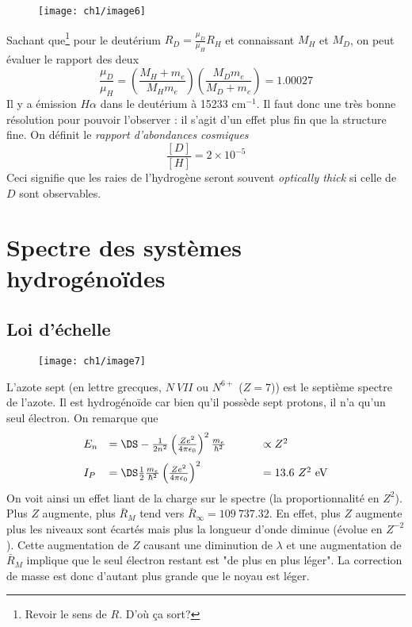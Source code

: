 	\begin{wrapfigure}[14]{l}{6cm}
	\texttt{[image: ch1/image6]}
	\end{wrapfigure}
Sachant que\footnote{Revoir le sens de $R$. D'où ça sort?} pour le deutérium $R_D = \frac{\mu_D}{\mu_H}R_H$ 
et connaissant $M_H$ et $M_D$, on peut évaluer le rapport des deux
\begin{equation}
\frac{\mu_D}{\mu_H} = \left(\frac{M_H+m_e}{M_Hm_e}\right)\left(\frac{M_Dm_e}{M_D+m_e}\right)=1.00027
\end{equation}
Il y a émission $H\alpha$ dans le deutérium à 15233 cm$^{-1}$. Il faut donc une très bonne résolution pour
pouvoir l'observer : il s'agit d'un effet plus fin que la structure fine. On définit le \textit{rapport 
d'abondances cosmiques}
\begin{equation}
\frac{[D]}{[H]}=2\times 10^{-5}
\end{equation}
Ceci signifie que les raies de l'hydrogène seront souvent \textit{optically thick} si celle de $D$ sont 
observables.

\section{Spectre des systèmes hydrogénoïdes}
\subsection{Loi d'échelle}
	\begin{wrapfigure}[8]{r}{6cm}
	\vspace{-8mm}
	\texttt{[image: ch1/image7]}
	\end{wrapfigure}
L'azote sept (en lettre grecques, $N\ VII$ ou $N^{6+}$ ($Z=7$)) est le septième spectre de l'azote. Il
est hydrogénoïde car bien qu'il possède sept protons, il n'a qu'un seul électron. On remarque que 
\begin{equation}
\begin{array}{lll}
E_n &=\DS -\frac{1}{2n^2}\left(\frac{Ze^2}{4\pi\epsilon_0}\right)^2\frac{m_e}{\hbar^2}\qquad \ &\propto
 Z^2\vspace{2mm}\\
I_P &=\DS \frac{1}{2}\frac{m_e}{\hbar^2}\left(\frac{Ze^2}{4\pi\epsilon_0}\right)^2 &=13.6\ Z^2\ \text{eV}
\end{array}
\end{equation}
On voit ainsi un effet liant de la charge sur le spectre (la proportionnalité en $Z^2$). Plus $Z$ augmente, 
plus $\bar R_M$ tend vers $\bar R_\infty = 109\ 737.32$. En effet, plus $Z$ augmente plus les niveaux sont
écartés mais plus la longueur d'onde diminue (évolue en $Z^{-2}$). Cette augmentation de $Z$ causant une 
diminution de $\lambda$ et une augmentation de $\bar R_M$ implique que le seul électron restant est 
"de plus en plus léger". La correction de masse est donc d'autant plus grande que le noyau est léger.\\

